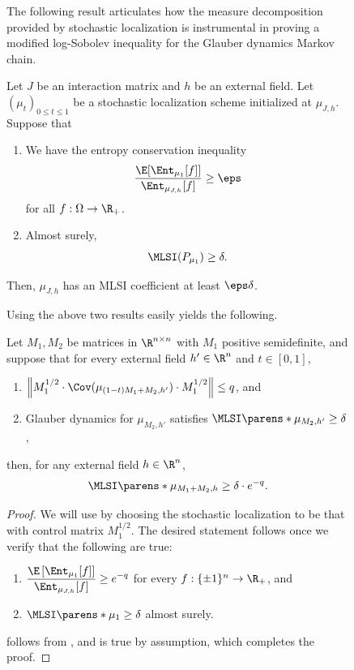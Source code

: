 \documentclass[11pt,letterpaper]{article}
\begin{document}
\begin{figure}
    The following result articulates how the measure decomposition provided by stochastic localization is instrumental in proving a modified log-Sobolev inequality for the Glauber dynamics Markov chain.
    \begin{theorem}[{\cite[Theorem 47]{CE22}}]  \label{thm:anneal}
        Let $J$ be an interaction matrix and $h$ be an external field.
        Let $(\mu_t)_{0\le t\le 1}$ be a stochastic localization scheme initialized at $\mu_{J,h}$.
        Suppose that
        \begin{enumerate}
            \item \label{item:entropy-conservation} We have the entropy conservation inequality
            \[ \frac{\E[\Ent_{\mu_1}[f]]}{\Ent_{\mu_{J,h}}[f]} \ge \eps \]
            for all $f : \Omega \to \R_+$.
            \item \label{item:MLSI-target} Almost surely,
            \[ \MLSI(P_{\mu_1}) \ge \delta. \]
        \end{enumerate}
        Then, $\mu_{J,h}$ has an MLSI coefficient at least $\eps\delta$.
    \end{theorem}

    Using the above two results easily yields the following.

    \begin{theorem} \label{thm:sum-MLSI}
        Let $M_1,M_2$ be matrices in $\R^{n \times n}$ with $M_1$ positive semidefinite, and suppose that for every external field $h' \in \R^{n}$ and $t\in[0,1]$,
        \begin{enumerate}
            \item $\left\| M_1^{1/2} \cdot \Cov(\mu_{(1-t)M_1+M_2,h'}) \cdot M_1^{1/2} \right\| \le q$, and
            \item Glauber dynamics for $\mu_{M_2,h'}$ satisfies $\MLSI\parens*{\mu_{M_2,h'}} \ge \delta$,
        \end{enumerate}
        then, for any external field $h \in \R^{n}$,
        \[
            \MLSI\parens*{\mu_{M_1+M_2,h}} \ge \delta \cdot e^{-q}.    
        \]
    \end{theorem}
    
    \begin{proof}
        We will use  by choosing the stochastic localization to be that with control matrix $M_1^{1/2}$.
        \noindent The desired statement follows once we verify that the following are true:
        \begin{enumerate}
            \item \label{item:entropy-con} $\displaystyle\frac{\E \left[\Ent_{\mu_1}[f]\right]}{\Ent_{\mu_{J,h}}[f]} \ge e^{-q}$ for every $f:\{\pm1\}^n\to\R_+$, and
            \item \label{item:final-MLSI} $\MLSI\parens*{\mu_1} \ge \delta$ almost surely.
        \end{enumerate}
         follows from , and  is true by assumption, which completes the proof.
    \end{proof}
    


\end{figure}
\end{document}
